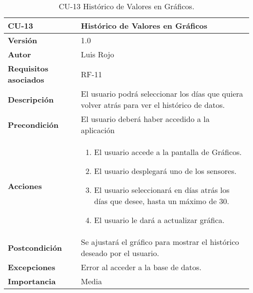 \begin{table}[p]
	\centering
	\begin{tabularx}{\linewidth}{ p{} p{} }
		\toprule
		\textbf{CU-13}    & \textbf{Histórico de Valores en Gráficos}\\
		\toprule
		\textbf{Versión}              & 1.0    \\
		\textbf{Autor}                & Luis Rojo \\
		\textbf{Requisitos asociados} & RF-11 \\
		\textbf{Descripción}          & El usuario podrá seleccionar los días que quiera volver atrás para ver el histórico de datos. \\
		\textbf{Precondición}         &  El usuario deberá haber accedido a la aplicación \\
		\textbf{Acciones}             &
		\begin{enumerate}
			\def\labelenumi{\arabic{enumi}.}
			\tightlist
			\item El usuario accede a la pantalla de Gráficos.
                \item El usuario desplegará uno de los sensores.
                \item El usuario seleccionará en días atrás los días que desee, hasta un máximo de 30.
                \item El usuario le dará a actualizar gráfica.
		\end{enumerate}\\
		\textbf{Postcondición}        & Se ajustará el gráfico para mostrar el histórico deseado por el usuario. \\
		\textbf{Excepciones}          &  Error al acceder a la base de datos.
           \\
		\textbf{Importancia}          & Media  \\
		\bottomrule
	\end{tabularx}
	\caption{CU-13 Histórico de Valores en Gráficos.}
\end{table}

